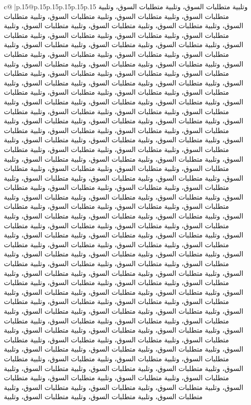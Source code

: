 \documentclass{article}
\begin{document}
{\begin{supertabular}{c@{$\;$}|p{.15\linewidth}@{}p{.15\linewidth}p{.15\linewidth}p{.15\linewidth}p{.15\linewidth}p{.15\linewidth}}
{{{وتلبية متطلبات السوق، وتلبية متطلبات السوق، وتلبية متطلبات السوق، وتلبية متطلبات السوق، وتلبية متطلبات السوق، وتلبية متطلبات السوق، وتلبية متطلبات السوق، وتلبية متطلبات السوق، وتلبية متطلبات السوق، وتلبية متطلبات السوق، وتلبية متطلبات السوق، وتلبية متطلبات السوق، وتلبية متطلبات السوق، وتلبية متطلبات السوق، وتلبية متطلبات السوق، وتلبية متطلبات السوق، وتلبية متطلبات السوق، وتلبية متطلبات السوق، وتلبية متطلبات السوق، وتلبية متطلبات السوق، وتلبية متطلبات السوق، وتلبية متطلبات السوق، وتلبية متطلبات السوق، وتلبية متطلبات السوق، وتلبية متطلبات السوق، وتلبية متطلبات السوق، وتلبية متطلبات السوق، وتلبية متطلبات السوق، وتلبية متطلبات السوق، وتلبية متطلبات السوق، وتلبية متطلبات السوق، وتلبية متطلبات السوق، وتلبية متطلبات السوق، وتلبية متطلبات السوق، وتلبية متطلبات السوق، وتلبية متطلبات السوق، وتلبية متطلبات السوق، وتلبية متطلبات السوق، وتلبية متطلبات السوق، وتلبية متطلبات السوق، وتلبية متطلبات السوق، وتلبية متطلبات السوق، وتلبية متطلبات السوق، وتلبية متطلبات السوق، وتلبية متطلبات السوق، وتلبية متطلبات السوق، وتلبية متطلبات السوق، وتلبية متطلبات السوق، وتلبية متطلبات السوق، وتلبية متطلبات السوق، وتلبية متطلبات السوق، وتلبية متطلبات السوق، وتلبية متطلبات السوق، وتلبية متطلبات السوق، وتلبية متطلبات السوق، وتلبية متطلبات السوق، وتلبية متطلبات السوق، وتلبية متطلبات السوق، وتلبية متطلبات السوق، وتلبية متطلبات السوق، وتلبية متطلبات السوق، وتلبية متطلبات السوق، وتلبية متطلبات السوق، وتلبية متطلبات السوق، وتلبية متطلبات السوق، وتلبية متطلبات السوق، وتلبية متطلبات السوق، وتلبية متطلبات السوق، وتلبية متطلبات السوق، وتلبية متطلبات السوق، وتلبية متطلبات السوق، وتلبية متطلبات السوق، وتلبية متطلبات السوق، وتلبية متطلبات السوق، وتلبية متطلبات السوق، وتلبية متطلبات السوق، وتلبية متطلبات السوق، وتلبية متطلبات السوق، وتلبية متطلبات السوق، وتلبية متطلبات السوق، وتلبية متطلبات السوق، وتلبية متطلبات السوق، وتلبية متطلبات السوق، وتلبية متطلبات السوق، وتلبية متطلبات السوق، وتلبية متطلبات السوق، وتلبية متطلبات السوق، وتلبية متطلبات السوق، وتلبية متطلبات السوق، وتلبية متطلبات السوق، وتلبية متطلبات السوق، وتلبية متطلبات السوق، وتلبية متطلبات السوق، وتلبية متطلبات السوق، وتلبية متطلبات السوق، وتلبية متطلبات السوق، وتلبية متطلبات السوق، وتلبية متطلبات السوق، وتلبية متطلبات السوق، وتلبية متطلبات السوق، وتلبية متطلبات السوق، وتلبية متطلبات السوق، وتلبية متطلبات السوق، وتلبية متطلبات السوق، وتلبية متطلبات السوق، وتلبية متطلبات السوق، وتلبية متطلبات السوق، وتلبية متطلبات السوق، وتلبية متطلبات السوق، وتلبية متطلبات السوق، وتلبية متطلبات السوق، وتلبية متطلبات السوق، وتلبية متطلبات السوق، وتلبية متطلبات السوق، وتلبية متطلبات السوق، وتلبية متطلبات السوق، وتلبية متطلبات السوق، وتلبية متطلبات السوق، وتلبية متطلبات السوق، وتلبية متطلبات السوق، وتلبية متطلبات السوق، وتلبية متطلبات السوق، وتلبية متطلبات السوق، وتلبية متطلبات السوق، وتلبية متطلبات السوق، وتلبية متطلبات السوق، وتلبية متطلبات السوق، وتلبية متطلبات السوق، وتلبية متطلبات السوق، وتلبية متطلبات السوق، وتلبية متطلبات السوق، وتلبية متطلبات السوق، وتلبية متطلبات السوق، وتلبية متطلبات السوق، وتلبية متطلبات السوق، وتلبية متطلبات السوق، وتلبية متطلبات السوق، وتلبية متطلبات السوق، وتلبية متطلبات السوق، وتلبية متطلبات السوق، وتلبية متطلبات السوق، وتلبية متطلبات السوق، وتلبية متطلبات السوق، وتلبية متطلبات السوق، وتلبية متطلبات السوق، وتلبية }}}
\end{supertabular}}
\end{document}
